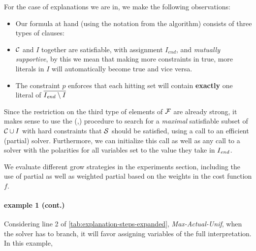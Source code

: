 For the case of explanations we are in, we make the following observations: 
\begin{itemize}
 \item Our formula at hand (using the notation from the \onestepo algorithm) consists of three types of clauses: 
 \item $\mathcal{C} $ and $I$ together are satisfiable, with assignment $I_{end}$, and \emph{mutually supportive}, by this we mean that making more constraints in \formulac true, more literals in $I$ will automatically become true and vice versa. 
 \item The constraint $p$ enforces that each hitting set will contain \textbf{exactly} one literal of  $\overline{I_\mathit{end} \setminus I}$
\end{itemize}
Since the restriction on the third type of elements of $\mathcal{F} $ are already strong, it makes sense to use the \grow(,\F) procedure to search for a \emph{maximal} satisfiable subset of $\mathcal{C} \cup I$ with hard constraints that $\mathcal{S}$ should be satisfied, using a call to an efficient  (partial) \maxsat solver. Furthermore, we can initialize this call as well as any call to a \sat solver with the polarities for all variables set to the value they take in $I_\mathit{end} $. %

We evaluate different grow strategies in the experiments section, including the use of partial \maxsat as well as weighted partial \maxsat based on the weights in the cost function $f$.

\paragraph{example 1 (cont.)} Considering line 2 of \ref{tab:explanation-steps-expanded}, \emph{Max-Actual-Unif}, when the \maxsat solver has to branch, it will favor assigning variables of the full interpretation. In this example, 






